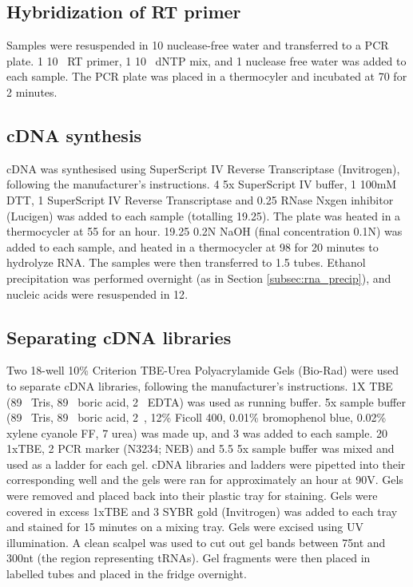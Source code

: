 \subsection{Hybridization of RT primer}
Samples were resuspended in 10\ul{} nuclease-free water and transferred to a PCR plate.
1\ul{} 10\si{\micro\Molar} RT primer, 1\ul{} 10\si{\micro\Molar} dNTP mix, and 1\ul{} nuclease free water was added to each sample.
The PCR plate was placed in a thermocyler and incubated at 70\C{} for 2 minutes.

\subsection{cDNA synthesis}
cDNA was synthesised using SuperScript IV Reverse Transcriptase (Invitrogen), following the manufacturer's instructions.
4\ul{} 5x SuperScript IV buffer, 1\ul{} 100mM DTT, 1\ul{} SuperScript IV Reverse Transcriptase and 0.25\ul{} RNase Nxgen inhibitor (Lucigen) was added to each sample (totalling 19.25\ul{}).
The plate was heated in a thermocycler at 55\C{} for an hour.
19.25\ul{} 0.2N NaOH (final concentration 0.1N) was added to each sample, and heated in a thermocycler at 98\C{} for 20 minutes to hydrolyze RNA.
The samples were then transferred to 1.5\ml{} tubes.
Ethanol precipitation was performed overnight (as in Section \ref{subsec:rna_precip}), and nucleic acids were resuspended in 12\ul{}.

\subsection{Separating cDNA libraries}
Two 18-well 10\% Criterion TBE-Urea Polyacrylamide Gels (Bio-Rad) were used to separate cDNA libraries, following the manufacturer's instructions.
1X TBE (89\si{\milli\Molar} Tris, 89\si{\milli\Molar} boric acid, 2\si{\milli\Molar} EDTA) was used as running buffer.
5x sample buffer (89\si{\milli\Molar} Tris, 89\si{\milli\Molar} boric acid, 2\si{\milli\Molar}, 12\% Ficoll 400, 0.01\% bromophenol blue, 0.02\% xylene cyanole FF, 7\si{\Molar} urea) was made up, and 3\ul{} was added to each sample.
20\ul{} 1xTBE, 2\ul{} PCR marker (N3234; NEB) and 5.5\ul{} 5x sample buffer was mixed and used as a ladder for each gel.
cDNA libraries and ladders were pipetted into their corresponding well and the gels were ran for approximately an hour at 90V.
Gels were removed and placed back into their plastic tray for staining.
Gels were covered in excess 1xTBE and 3\ul{} SYBR gold (Invitrogen) was added to each tray and stained for 15 minutes on a mixing tray.
Gels were excised using UV illumination.
A clean scalpel was used to cut out gel bands between 75nt and 300nt (the region representing tRNAs).
Gel fragments were then placed in labelled tubes and placed in the fridge overnight.

